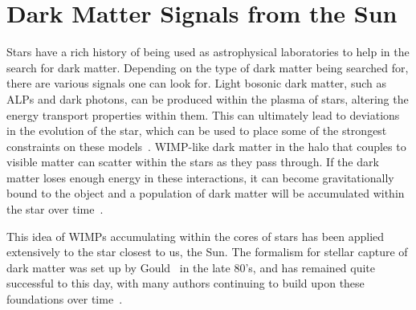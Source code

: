 \section{Dark Matter Signals from the Sun}

Stars have a rich history of being used as astrophysical laboratories to help in the search for dark matter. Depending on the type of dark matter being searched for, there are various signals one can look for.
Light bosonic dark matter, such as ALPs and dark photons, can be produced within the plasma of stars, altering the energy transport properties within them.
This can ultimately lead to deviations in the evolution of the star, which can be used to place some of the strongest constraints on these models~\cite{An:2013yfc_oct_Newstellarconstraints, Dolan:2022kul_oct_Advancingglobularcluster, Dolan:2023cjs_jun_ConstrainingDarkPhotons}.
WIMP-like dark matter in the halo that couples to visible matter can scatter within the stars as they pass through. 
If the dark matter loses enough energy in these interactions, it can become gravitationally bound to the object and a population of dark matter will be accumulated within the star over time~\cite{Press:1985ug_Capturesungalactic, Gould:1987ju_WeaklyInteractingMassive, Gould:1987ir_ResonantEnhancementsWIMP, Jungman:1995df_Supersymmetricdarkmatter, Busoni:2017mhe_oct_Evaporationscatteringmomentum}. 

This idea of WIMPs accumulating within the cores of stars has been applied extensively to the star closest to us, the Sun. The formalism for stellar capture of dark matter was set up by Gould~\cite{Gould:1987ir_ResonantEnhancementsWIMP, Gould:1987ju_WeaklyInteractingMassive,Gould:1991va_Bigbangarcheology} in the late 80's, and has remained quite successful to this day,  with many authors continuing to build upon these foundations over time~\cite{Busoni:2017mhe_oct_Evaporationscatteringmomentum,Garani:2017jcj_may_DarkmatterSun,Bramante:2017xlb_sep_Multiscatterstellarcapture}.

